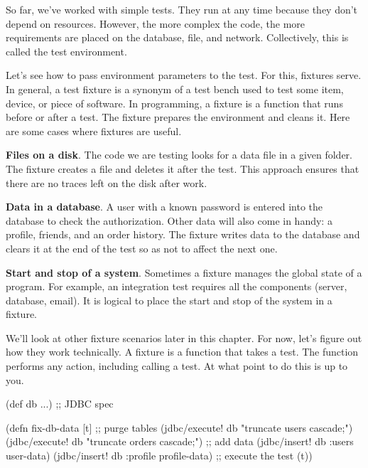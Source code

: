 
So far, we've worked with simple tests. They run at any time because they don't depend on resources. However, the more complex the code, the more requirements are placed on the database, file, and network. Collectively, this is called the test environment.

Let's see how to pass environment parameters to the test. For this, fixtures serve. In general, a test fixture is a synonym of a test bench used to test some item, device, or piece of software.  In programming, a fixture is a function that runs before or after a test. The fixture prepares the environment and cleans it. Here are some cases where fixtures are useful.


\textbf{Files on a disk}. The code we are testing looks for a data file in a given folder. The fixture creates a file and deletes it after the test. This approach ensures that there are no traces left on the disk after work.

\textbf{Data in a database}. A user with a known password is entered into the database to check the authorization. Other data will also come in handy: a profile, friends, and an order history. The fixture writes data to the database and clears it at the end of the test so as not to affect the next one.

\textbf{Start and stop of a system}. Sometimes a fixture manages the global state of a program. For example, an integration test requires all the components (server, database, email). It is logical to place the start and stop of the system in a fixture.

We'll look at other fixture scenarios later in this chapter. For now, let's figure out how they work technically. A fixture is a function that takes a test. The function performs any action, including calling a test. At what point to do this is up to you.


\ifnarrow

\begin{english}
  \begin{clojure}
(def db {...}) ;; JDBC spec

(defn fix-db-data [t]
  ;; purge tables
  (jdbc/execute! db
    "truncate users cascade;")
  (jdbc/execute! db
    "truncate orders cascade;")
  ;; add data
  (jdbc/insert! db :users user-data)
  (jdbc/insert! db
    :profile profile-data)
  ;; execute the test
  (t))
  \end{clojure}
\end{english}

